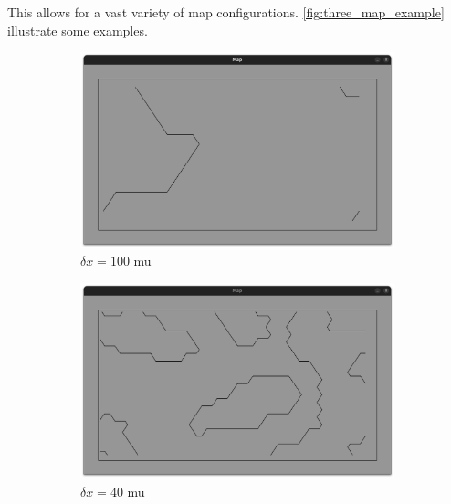 \documentclass[../main.tex]{subfiles}
\begin{document}
\vspace{0.5em}

This allows for a vast variety of map configurations. \autoref{fig:three_map_example} illustrate some examples.
\begin{figure}[H]
    \centering
    \begin{subfigure}{0.3\textwidth}
        \centering
        \includegraphics[width=\textwidth]{IMAGES/part5/map_dx100.png}
        \caption{$\delta x = 100$ mu}
		\label{fig:real_map_100}
    \end{subfigure}
    \hfill
    \begin{subfigure}{0.3\textwidth}
        \centering
        \includegraphics[width=\textwidth]{IMAGES/part5/map_dx40.png}
        \caption{$\delta x = 40$ mu}
		\label{fig:real_map_40}
    \end{subfigure}
    \hfill
    \begin{subfigure}{0.3\textwidth}
        \centering

\end{subfigure}
\end{figure}
\end{document}
